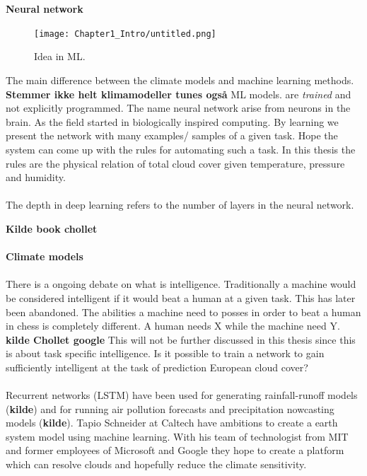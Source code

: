 \\ \\ 
\textbf{Neural network}
\begin{figure}
    \centering
    \texttt{[image: Chapter1\_Intro/untitled.png]}
    \caption{Idea in ML.}
    \label{fig:ml}
\end{figure}
The main difference between the climate models and machine learning methods. \textbf{Stemmer ikke helt klimamodeller tunes også} ML models. are \textit{trained} and not explicitly programmed. The name neural network arise from neurons in the brain. As the field started in biologically
inspired computing. By learning we present the network with many examples/ samples of a given task. Hope the system can come up with the rules for automating such a task. In this thesis the rules are the physical relation of total cloud cover given temperature, pressure and humidity.
\\ \\
The depth in deep learning refers to the number of layers in the neural network.



\textbf{Kilde book chollet}
\\ \\
\textbf{Climate models}
\\ \\
There is a ongoing debate on what is intelligence. Traditionally a machine would be considered intelligent if it would beat a human at a given task. This has later been abandoned. The abilities a machine need to posses in order to beat a human in chess is completely different. A human needs X while the machine need Y. \textbf{kilde Chollet google} This will not be further discussed in this thesis since this is about task specific intelligence. Is it possible to train a network to gain sufficiently intelligent at the task of prediction European cloud cover?
\\ \\
Recurrent networks (LSTM) have been used for generating rainfall-runoff models (\textbf{kilde}) and for running air pollution forecasts and precipitation nowcasting models (\textbf{kilde}). Tapio Schneider at Caltech have ambitions to create a earth system model using machine learning. With his team of technologist from MIT and former employees of Microsoft and Google they hope to create a platform which can resolve clouds and hopefully reduce the climate sensitivity. 
\\ \\

